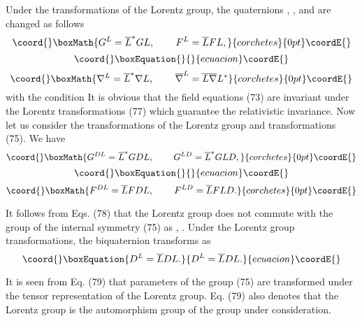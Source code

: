 \documentclass[a4paper,12pt]{article}
\begin{document}
Under the transformations of the Lorentz group, the quaternions
\coordHE{}, \coordHE{}, \myHighlight{$ \nabla $}\coordHE{} and \myHighlight{$\overline{\nabla }$}\coordHE{} are changed as
follows
\[\coord{}\boxMath{
G^L=\overline{L}^{*}GL,\hspace{0.3in}F^L=\overline{L}FL,
}{corchetes}{0pt}\coordE{}\]
\vspace{-8mm}
\begin{equation}\coord{}\boxEquation{
\label{77}
}{
}{ecuacion}\coordE{}\end{equation}
\vspace{-8mm}
\[\coord{}\boxMath{
\nabla ^L=\overline{L}^{*}\nabla L,\hspace{0.3in}\overline{\nabla
}^L= \overline{L}\overline{\nabla }L^{*}
}{corchetes}{0pt}\coordE{}\]
with the condition \coordHE{} It is obvious
that the field equations (73) are invariant under the Lorentz
transformations (77) which guarantee the relativistic invariance.
Now let us consider the transformations of the Lorentz group \coordHE{}
and \coordHE{}transformations (75). We have
\[\coord{}\boxMath{
G^{DL}=\overline{L}^{*}GDL,\hspace{0.3in}G^{LD}=\overline{L}^{*}GLD,
}{corchetes}{0pt}\coordE{}\]
\vspace{-8mm}
\begin{equation}\coord{}\boxEquation{
\label{78}
}{
}{ecuacion}\coordE{}\end{equation}
\vspace{-8mm}
\[\coord{}\boxMath{
F^{DL}=\overline{L}FDL,\hspace{0.3in}F^{LD}=\overline{L}FLD.
}{corchetes}{0pt}\coordE{}\]

It follows from Eqs. (78) that the Lorentz group does not commute with the
group of the internal symmetry (75) as \coordHE{}, \coordHE{}. Under the Lorentz group transformations, the biquaternion \coordHE{}
transforms as
\begin{equation}\coord{}\boxEquation{
D^L=\overline{L}DL.  \label{79}
}{
D^L=\overline{L}DL.  }{ecuacion}\coordE{}\end{equation}

It is seen from Eq. (79) that parameters of the group (75) are transformed
under the tensor representation of the Lorentz group. Eq. (79) also denotes
that the Lorentz group is the automorphism group of the group under
consideration.
\end{document}
